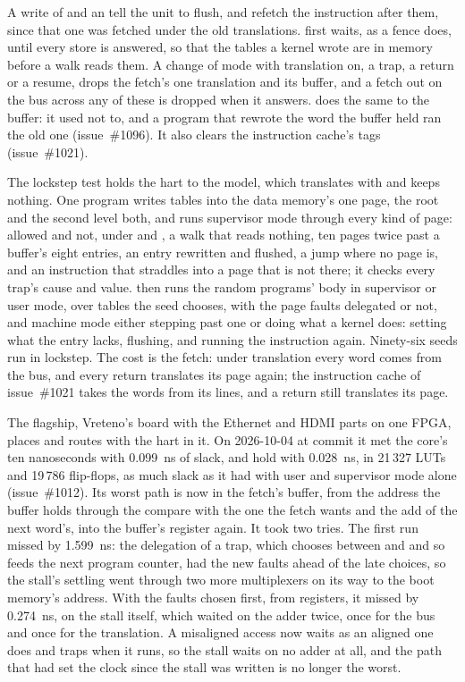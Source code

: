 \documentclass[journal,onecolumn,9pt]{IEEEtran}
\begin{document}
A write of  and an  tell the unit to flush,
and refetch the instruction after them, since that one was fetched
under the old translations.  first waits, as a fence
does, until every store is answered, so that the tables a kernel wrote
are in memory before a walk reads them. A change of mode with
translation on, a trap, a return or a resume, drops the fetch's one
translation and its buffer, and a fetch out on the bus across any of
these is dropped when it answers.  does the same to the
buffer: it used not to, and a program that rewrote the word the buffer
held ran the old one (issue~\#1096). It also clears the instruction
cache's tags (issue~\#1021).

The lockstep test holds the hart to the model, which translates with
 and keeps nothing. One program writes tables into the
data memory's one page, the root and the second level both, and runs
supervisor mode through every kind of page: allowed and not, under
 and , a walk that reads nothing, ten pages twice
past a buffer's eight entries, an entry rewritten and flushed, a jump
where no page is, and an instruction that straddles into a page that is
not there; it checks every trap's cause and value. 
then runs the random programs' body in supervisor or user mode, over
tables the seed chooses, with the page faults delegated or not, and
machine mode either stepping past one or doing what a kernel does:
setting what the entry lacks, flushing, and running the instruction
again. Ninety-six seeds run in lockstep. The cost is the fetch: under
translation every word comes from the bus, and every return translates
its page again; the instruction cache of issue~\#1021 takes the words
from its lines, and a return still translates its page.

The flagship, Vreteno's board with the Ethernet and HDMI parts on one
FPGA, places and routes with the hart in it. On 2026-10-04 at commit
 it met the core's ten nanoseconds with 0.099~ns of
slack, and hold with 0.028~ns, in 21\,327 LUTs and 19\,786
flip-flops, as much slack as it had with user and supervisor mode
alone (issue~\#1012). Its worst path is now in the
fetch's buffer, from the address the buffer holds through the compare
with the one the fetch wants and the add of the next word's, into the
buffer's register again. It took two tries. The first run missed by
1.599~ns: the delegation of a trap, which chooses between 
and  and so feeds the next program counter, had the new
faults ahead of the late choices, so the stall's settling went through
two more multiplexers on its way to the boot memory's address. With the
faults chosen first, from registers, it missed by 0.274~ns, on the
stall itself, which waited on the adder twice, once for the bus and
once for the translation. A misaligned access now waits as an aligned
one does and traps when it runs, so the stall waits on no adder at all,
and the path that had set the clock since the stall was written is no
longer the worst.
\end{document}
